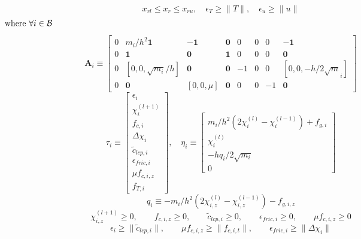 \documentclass[a4paper,10pt]{article}
\begin{document}
\begin{equation}
x_{rl} \leq x_r \leq x_{ru}, \quad \epsilon_T \geq \| T \|, \quad \epsilon_u \geq \| u \|
\end{equation}
\begin{align}
\text{where } \forall i \in \mathcal{B} & \quad\quad\quad\quad\quad\quad\quad\quad\quad\quad\quad\quad\quad\quad\quad
\quad\quad\quad\quad\quad\quad\quad\quad\quad\quad\quad\quad\quad\quad\quad
\quad\quad\quad\quad\quad\quad\quad\quad\quad\quad\quad\quad\quad\quad\quad \notag
\end{align}
\begin{equation}
\mathbf{A}_i \equiv
\left[\begin{array}{cccccccc}
0 & m_i/h^2\mathbf{1}     & -\mathbf{1}   & \mathbf{0} & 0   & 0  & 0  & -\mathbf{1}           \\
0 &    \mathbf{1}         & \mathbf{0}    & \mathbf{1} & 0   & 0  & 0  & \mathbf{0}            \\
0 & [ 0, 0, \sqrt{m_i}/h] & \mathbf{0}    & \mathbf{0} & -1  & 0  & 0  & [0,0,-h/2\sqrt{m}_i]  \\
0 & \mathbf{0}            & [ 0, 0, \mu ] & \mathbf{0} & 0   & 0  & -1 & \mathbf{0}
\end{array}\right]
\end{equation}
\begin{equation}
\tau_i \equiv
\left[\begin{array}{c}
\epsilon_i \\ \chi^{(l+1)}_i \\ f_{c,i} \\ \Delta\chi_i \\ \tilde{c}_{lcp,i} \\ \epsilon_{fric,i} \\ \mu f_{c,i,z} \\ f_{T,i}
\end{array}\right], \quad
\eta_i \equiv
\left[\begin{array}{c}
m_i/h^2(2\chi^{(l)}_i-\chi^{(l-1)}_i) + f_{g,i} \\
\chi^{(l)}_i \\
-hq_i/2\sqrt{m_i} \\
0
\end{array}\right]
\end{equation}
\begin{equation}
q_i \equiv -m_i/h^2(2\chi^{(l)}_{i,z}-\chi^{(l-1)}_{i,z})-f_{g,i,z}
\end{equation}
\begin{equation}
\chi^{(l+1)}_{i,z} \geq 0       , \quad\quad
f_{c,i,z} \geq 0              , \quad\quad
\tilde{c}_{lcp,i} \geq 0          , \quad\quad
\epsilon_{fric,i} \geq 0          , \quad\quad
\mu f_{c,i,z} \geq 0
\end{equation}
\begin{equation}
\epsilon_i            \geq \| \tilde{c}_{lcp,i} \| , \quad\quad
\mu f_{c,i,z}  \geq \| f_{c,i,t}         \| , \quad\quad
\epsilon_{fric,i}    \geq \| \Delta\chi_i      \| 
\end{equation}
\end{document}
